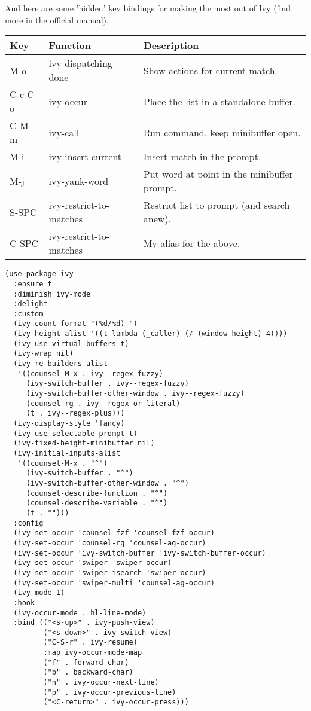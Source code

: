 \documentclass[12pt]{article}
\begin{document}
And here are some 'hidden' key bindings for making the most out of Ivy
(find more in the official manual).

\begin{center}
\begin{tabular}{lll}
Key & Function & Description\\
\hline
M-o & ivy-dispatching-done & Show actions for current match.\\
C-c C-o & ivy-occur & Place the list in a standalone buffer.\\
C-M-m & ivy-call & Run command, keep minibuffer open.\\
M-i & ivy-insert-current & Insert match in the prompt.\\
M-j & ivy-yank-word & Put word at point in the minibuffer prompt.\\
S-SPC & ivy-restrict-to-matches & Restrict list to prompt (and search anew).\\
C-SPC & ivy-restrict-to-matches & My alias for the above.\\
\end{tabular}
\end{center}

\begin{verbatim}
(use-package ivy
  :ensure t
  :diminish ivy-mode
  :delight
  :custom
  (ivy-count-format "(%d/%d) ")
  (ivy-height-alist '((t lambda (_caller) (/ (window-height) 4))))
  (ivy-use-virtual-buffers t)
  (ivy-wrap nil)
  (ivy-re-builders-alist
   '((counsel-M-x . ivy--regex-fuzzy)
     (ivy-switch-buffer . ivy--regex-fuzzy)
     (ivy-switch-buffer-other-window . ivy--regex-fuzzy)
     (counsel-rg . ivy--regex-or-literal)
     (t . ivy--regex-plus)))
  (ivy-display-style 'fancy)
  (ivy-use-selectable-prompt t)
  (ivy-fixed-height-minibuffer nil)
  (ivy-initial-inputs-alist
   '((counsel-M-x . "^")
     (ivy-switch-buffer . "^")
     (ivy-switch-buffer-other-window . "^")
     (counsel-describe-function . "^")
     (counsel-describe-variable . "^")
     (t . "")))
  :config
  (ivy-set-occur 'counsel-fzf 'counsel-fzf-occur)
  (ivy-set-occur 'counsel-rg 'counsel-ag-occur)
  (ivy-set-occur 'ivy-switch-buffer 'ivy-switch-buffer-occur)
  (ivy-set-occur 'swiper 'swiper-occur)
  (ivy-set-occur 'swiper-isearch 'swiper-occur)
  (ivy-set-occur 'swiper-multi 'counsel-ag-occur)
  (ivy-mode 1)
  :hook
  (ivy-occur-mode . hl-line-mode)
  :bind (("<s-up>" . ivy-push-view)
         ("<s-down>" . ivy-switch-view)
         ("C-S-r" . ivy-resume)
         :map ivy-occur-mode-map
         ("f" . forward-char)
         ("b" . backward-char)
         ("n" . ivy-occur-next-line)
         ("p" . ivy-occur-previous-line)
         ("<C-return>" . ivy-occur-press)))


\end{verbatim}
\end{document}
